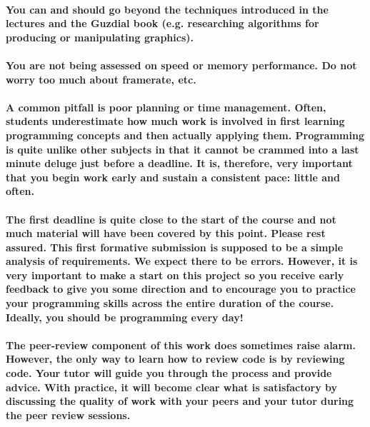\documentclass{../../fal_assignment}
\begin{document}
\paragraph{You can and should go beyond the techniques introduced in the lectures and the Guzdial book (e.g. researching algorithms for producing or manipulating graphics).}

\paragraph{You are not being assessed on speed or memory performance. Do not worry too much about framerate, etc.}

\paragraph{A common pitfall is poor planning or time management. Often, students underestimate how much work is involved in first learning programming concepts and then actually applying them. Programming is quite unlike other subjects in that it cannot be crammed into a last minute deluge just before a deadline. It is, therefore, very important that you begin work early and sustain a consistent pace: little and often.}

\paragraph{The first deadline is quite close to the start of the course and not much material will have been covered by this point. Please rest assured. This first formative submission is supposed to be a simple analysis of requirements. We expect there to be errors. However, it is very important to make a start on this project so you receive early feedback to give you some direction and to encourage you to practice your programming skills across the entire duration of the course. Ideally, you should be programming every day!}

\paragraph{The peer-review component of this work does sometimes raise alarm. However, the only way to learn how to review code is by reviewing code. Your tutor will guide you through the process and provide advice. With practice, it will become clear what is satisfactory by discussing the quality of work with your peers and your tutor during the peer review sessions.} 
\end{document}
